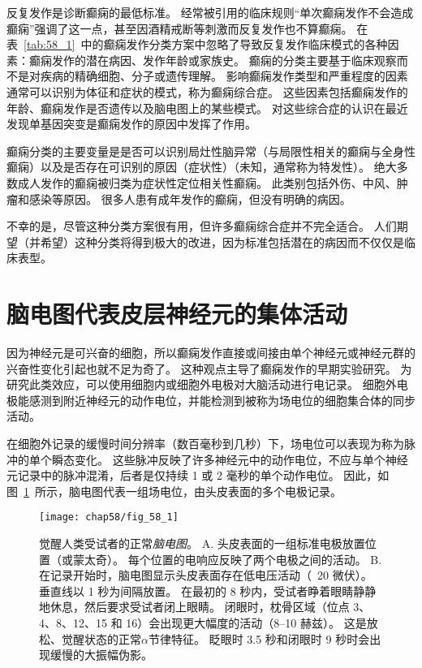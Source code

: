 反复发作是诊断癫痫的最低标准。
经常被引用的临床规则“单次癫痫发作不会造成癫痫”强调了这一点，甚至因酒精戒断等刺激而反复发作也不算癫痫。
在表~\ref{tab:58_1}~中的癫痫发作分类方案中忽略了导致反复发作临床模式的各种因素：癫痫发作的潜在病因、发作年龄或家族史。
癫痫的分类主要基于临床观察而不是对疾病的精确细胞、分子或遗传理解。
影响癫痫发作类型和严重程度的因素通常可以识别为体征和症状的模式，称为癫痫综合症。
这些因素包括癫痫发作的年龄、癫痫发作是否遗传以及脑电图上的某些模式。
对这些综合症的认识在最近发现单基因突变是癫痫发作的原因中发挥了作用。


癫痫分类的主要变量是是否可以识别局灶性脑异常（与局限性相关的癫痫与全身性癫痫）以及是否存在可识别的原因（症状性）（未知，通常称为特发性）。
绝大多数成人发作的癫痫被归类为症状性定位相关性癫痫。
此类别包括外伤、中风、肿瘤和感染等原因。
很多人患有成年发作的癫痫，但没有明确的病因。


不幸的是，尽管这种分类方案很有用，但许多癫痫综合症并不完全适合。
人们期望（并希望）这种分类将得到极大的改进，因为标准包括潜在的病因而不仅仅是临床表型。



\section{脑电图代表皮层神经元的集体活动}

因为神经元是可兴奋的细胞，所以癫痫发作直接或间接由单个神经元或神经元群的兴奋性变化引起也就不足为奇了。
这种观点主导了癫痫发作的早期实验研究。
为研究此类效应，可以使用细胞内或细胞外电极对大脑活动进行电记录。
细胞外电极能感测到附近神经元的动作电位，并能检测到被称为场电位的细胞集合体的同步活动。


在细胞外记录的缓慢时间分辨率（数百毫秒到几秒）下，场电位可以表现为称为脉冲的单个瞬态变化。
这些脉冲反映了许多神经元中的动作电位，不应与单个神经元记录中的脉冲混淆，后者是仅持续 1 或 2 毫秒的单个动作电位。
因此，如图~\ref{fig:58_1}~所示，脑电图代表一组场电位，由头皮表面的多个电极记录。


\begin{figure}[htbp]
	\centering
	\texttt{[image: chap58/fig\_58\_1]}
	\caption{觉醒人类受试者的正常\textit{脑电图}。
		A. 头皮表面的一组标准电极放置位置（或蒙太奇）。
		每个位置的电响应反映了两个电极之间的活动。
		B. 在记录开始时，脑电图显示头皮表面存在低电压活动（~20 微伏）。
		垂直线以 1 秒为间隔放置。
		在最初的 8 秒内，受试者睁着眼睛静静地休息，然后要求受试者闭上眼睛。
		闭眼时，枕骨区域（位点 3、4、8、12、15 和 16）会出现更大幅度的活动（8–10 赫兹）。
		这是放松、觉醒状态的正常$ \alpha $节律特征。
		眨眼时 3.5 秒和闭眼时 9 秒时会出现缓慢的大振幅伪影。}
	\label{fig:58_1}
\end{figure}


